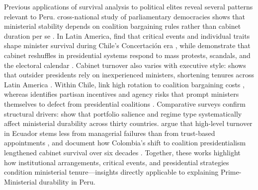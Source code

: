 \documentclass[a4paper, 12pt]{article}
\begin{document}
Previous applications of survival analysis to political elites reveal several patterns relevant to Peru. \citet{huber_replacing_2008} cross-national study of parliamentary democracies shows that ministerial stability depends on coalition bargaining rules rather than cabinet duration per se . In Latin America, \citet{gonzalez-bustamante_cambios_2016} find that critical events and individual traits shape minister survival during Chile’s Concertación era , while \citet{camerlo_minister_2015-1} demonstrate that cabinet reshuffles in presidential systems respond to mass protests, scandals, and the electoral calendar . Cabinet turnover also varies with executive style: \citet{carreras_presidentes_2013} shows that outsider presidents rely on inexperienced ministers, shortening tenures across Latin America . Within Chile, \citet{avendano_rotacion_2012} link high rotation to coalition bargaining costs , whereas \citet{martinez-gallardo_out_2012} identifies partisan incentives and agency risks that prompt ministers themselves to defect from presidential coalitions . Comparative surveys confirm structural drivers: \citet{fischer_duration_2012}  show that portfolio salience and regime type systematically affect ministerial durability across thirty countries. \citet{jara_iniguez_rotacion_2019} argue that high-level turnover in Ecuador stems less from managerial failures than from trust-based appointments , and \citet{mejia_es_2021} document how Colombia’s shift to coalition presidentialism lengthened cabinet survival over six decades . Together, these works highlight how institutional arrangements, critical events, and presidential strategies condition ministerial tenure—insights directly applicable to explaining Prime-Ministerial durability in Peru.



\renewcommand{\refname}{Bibliography}
\end{document}
